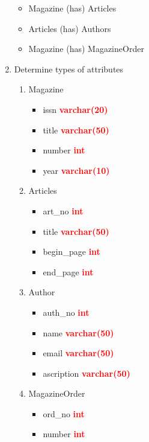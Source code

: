 \documentclass[]{article}
\begin{document}
\begin{enumerate}
\begin{itemize}
\item Magazine (has) Articles
\item Articles (has) Authors
\item Magazine (has) MagazineOrder
\end{itemize}

\item Determine types of attributes

\begin{enumerate}
\item Magazine
\begin{itemize}
\item issn \textcolor{red}{\textbf{varchar(20)}}
\item title \textcolor{red}{\textbf{varchar(50)}}
\item number \textcolor{red}{\textbf{int}}
\item year \textcolor{red}{\textbf{varchar(10)}}
\end{itemize}

\item Articles
\begin{itemize}
\item art\_no \textcolor{red}{\textbf{int}}
\item title \textcolor{red}{\textbf{varchar(50)}}
\item begin\_page \textcolor{red}{\textbf{int}}
\item end\_page \textcolor{red}{\textbf{int}}
\end{itemize}

\item Author
\begin{itemize}
\item auth\_no \textcolor{red}{\textbf{int}}
\item name \textcolor{red}{\textbf{varchar(50)}}
\item email \textcolor{red}{\textbf{varchar(50)}}
\item ascription \textcolor{red}{\textbf{varchar(50)}}
\end{itemize}

\item MagazineOrder
\begin{itemize}
\item ord\_no \textcolor{red}{\textbf{int}}
\item number \textcolor{red}{\textbf{int}}
\end{itemize}
\end{enumerate}


\end{enumerate}
\end{document}
